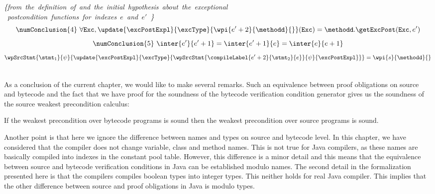\begin{description}
	      \mbox{\rm\textit{\{from the definition of \getExcPost{} and  the initial hypothesis about the exceptional }}\\
	      \mbox{\rm\textit{  postcondition functions for indexes $e$ and $e' $ \}}}
	    	     $$ \numConclusion{4} \ \forall \mbox{\rm\texttt{Exc}} ,  \update{\excPostExpl}{\excType}{ \wpi{e'+2}{\methodd}{} }(\mbox{\rm\texttt{Exc}}) = 
                  \methodd.\getExcPost(\mbox{\rm\texttt{Exc}}, e' )$$
	     $$ \numConclusion{5} \ \inter{e'}{e' + 1} = \inter{e'+1 }{e} = \inter{e}{e+1}$$
	      $$ \wpSrcStmt{\stmt_1 }
                         {  \psi}
			 {  \update{\excPostExpl}{\excType}{ \wpSrcStmt{\compileLabel{e'+2}{\stmt_2}{e} }{\psi}{\excPostExpl }} } =
			  \wpi{s}{\methodd}{}$$
	      
	   
\end{description}
\Qed \\

As a conclusion of the current chapter, we would like to make several remarks. 
Such an equivalence between proof obligations on source and bytecode and the fact that
we have proof for the soundness of the bytecode verification condition generator
 gives us the soundness of the source  weakest precondition calculus:  
\begin{thm}\label{wpEq:bc2src}
If the weakest precondition over bytecode programs is sound  
then the weakest precondition over source programs is sound.
\end{thm}
Another point is that here we ignore the difference between names and types on  source and bytecode level. 
In this chapter, we have considered that the compiler  does not change  variable, class and method  names.
 This is not true for Java compilers, as these names are basically compiled into 
indexes in the constant pool table. However, this difference is a minor detail and this means that 
the equivalence between source and bytecode verification conditions in Java can be established modulo names.
The second detail in the formalization presented here is that the compilers compiles boolean types into integer types.
This neither holds for real Java compiler.  This implies that the other difference between source and proof
obligations in Java is modulo types. 
